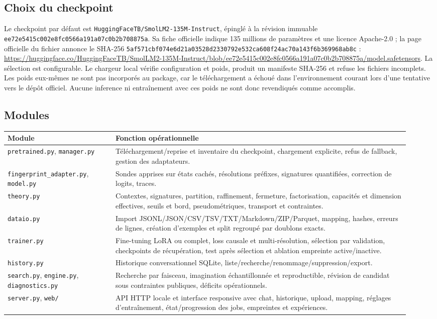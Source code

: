 \documentclass[11pt,a4paper]{article}
\begin{document}
\subsection{Choix du checkpoint}
Le checkpoint par défaut est \texttt{HuggingFaceTB/SmolLM2-135M-Instruct}, épinglé à la révision immuable \texttt{ee72e5415c002e8fc0566a191a07c0b2b708875a}. Sa fiche officielle indique 135 millions de paramètres et une licence Apache-2.0 ; la page officielle du fichier annonce le SHA-256 \texttt{5af571cbf074e6d21a03528d2330792e532ca608f24ac70a143f6b369968ab8c} : \url{https://huggingface.co/HuggingFaceTB/SmolLM2-135M-Instruct/blob/ee72e5415c002e8fc0566a191a07c0b2b708875a/model.safetensors}. La sélection est configurable. Le chargeur local vérifie configuration et poids, produit un manifeste SHA-256 et refuse les fichiers incomplets. Les poids eux-mêmes ne sont pas incorporés au package, car le téléchargement a échoué dans l'environnement courant lors d'une tentative vers le dépôt officiel. Aucune inference ni entraînement avec ces poids ne sont donc revendiqués comme accomplis.

\subsection{Modules}
\begin{longtable}{p{0.25\linewidth}p{0.68\linewidth}}
\toprule
\textbf{Module} & \textbf{Fonction opérationnelle}\\\midrule
\endhead
\texttt{pretrained.py}, \texttt{manager.py} & Téléchargement/reprise et inventaire du checkpoint, chargement explicite, refus de fallback, gestion des adaptateurs.\\
\texttt{fingerprint\_adapter.py}, \texttt{model.py} & Sondes apprises sur états cachés, résolutions préfixes, signatures quantifiées, correction de logits, traces.\\
\texttt{theory.py} & Contextes, signatures, partition, raffinement, fermeture, factorisation, capacités et dimension effectives, seuils et bord, pseudométriques, transport et contraintes.\\
\texttt{dataio.py} & Import JSONL/JSON/CSV/TSV/TXT/Markdown/ZIP/Parquet, mapping, hashes, erreurs de lignes, création d'exemples et split regroupé par doublons exacts.\\
\texttt{trainer.py} & Fine-tuning LoRA ou complet, loss causale et multi-résolution, sélection par validation, checkpoints de récupération, test après sélection et ablation empreinte active/inactive.\\
\texttt{history.py} & Historique conversationnel SQLite, liste/recherche/renommage/suppression/export.\\
\texttt{search.py}, \texttt{engine.py}, \texttt{diagnostics.py} & Recherche par faisceau, imagination échantillonnée et reproductible, révision de candidat sous contraintes publiques, déficits opérationnels.\\
\texttt{server.py}, \texttt{web/} & API HTTP locale et interface responsive avec chat, historique, upload, mapping, réglages d'entraînement, état/progression des jobs, empreintes et expériences.\\
\bottomrule
\end{longtable}
\end{document}
